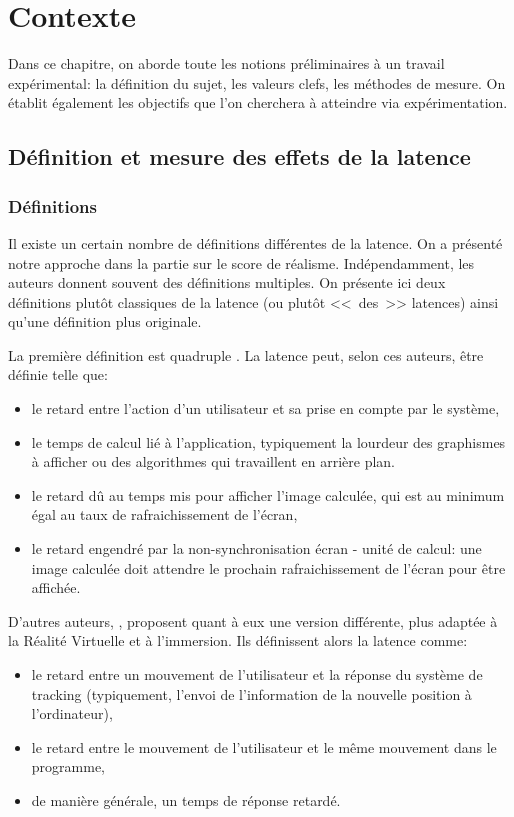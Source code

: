 \chapter{Contexte}
	\par Dans ce chapitre, on aborde toute les notions préliminaires à un travail expérimental: la définition du sujet, les valeurs clefs, les méthodes de mesure. On établit également les objectifs que l'on cherchera à atteindre via expérimentation.
	
	\section{Définition et mesure des effets de la latence}
	\subsection{Définitions}	
	\par Il existe un certain nombre de définitions différentes de la latence. On a présenté notre approche dans la partie sur le score de réalisme. Indépendamment, les auteurs donnent souvent des définitions multiples. On présente ici deux définitions plutôt classiques de la latence (ou plutôt <<~des~>> latences) ainsi qu'une définition plus originale.
	
	\par La première définition est quadruple \citep{papadakis_system_2011}. La latence peut, selon ces auteurs, être définie telle que:
	\begin{itemize}
		\item le retard entre l'action d'un utilisateur et sa prise en compte par le système,
		\item le temps de calcul lié à l'application, typiquement la lourdeur des graphismes à afficher ou des algorithmes qui travaillent en arrière plan.
		\item le retard dû au temps mis pour afficher l'image calculée, qui est au minimum égal au taux de rafraichissement de l'écran,
		\item le retard engendré par la non-synchronisation écran - unité de calcul: une image calculée doit attendre le prochain rafraichissement de l'écran pour être affichée.
	\end{itemize}		
	
	\par D'autres auteurs, \citep{hale_handbook_2015}, proposent quant à eux une version différente, plus adaptée à la Réalité Virtuelle et à l'immersion. Ils définissent alors la latence comme:
	\begin{itemize}
		\item le retard entre un mouvement de l'utilisateur et la réponse du système de tracking (typiquement, l'envoi de l'information de la nouvelle position à l'ordinateur),
		\item le retard entre le mouvement de l'utilisateur et le même mouvement dans le programme,
		\item de manière générale, un temps de réponse retardé.
	\end{itemize}		
	
